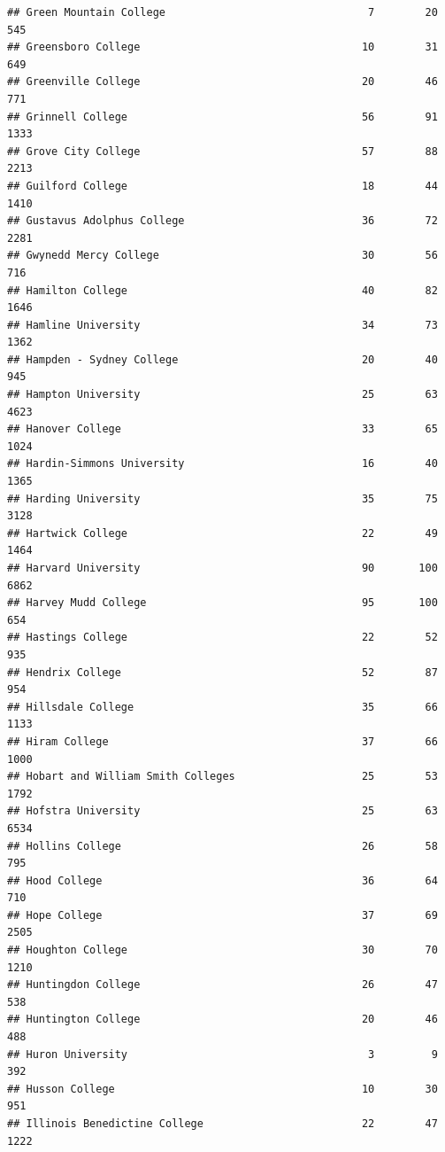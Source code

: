 \documentclass[
]{article}
\begin{document}
\begin{verbatim}
## Green Mountain College                                7        20         545
## Greensboro College                                   10        31         649
## Greenville College                                   20        46         771
## Grinnell College                                     56        91        1333
## Grove City College                                   57        88        2213
## Guilford College                                     18        44        1410
## Gustavus Adolphus College                            36        72        2281
## Gwynedd Mercy College                                30        56         716
## Hamilton College                                     40        82        1646
## Hamline University                                   34        73        1362
## Hampden - Sydney College                             20        40         945
## Hampton University                                   25        63        4623
## Hanover College                                      33        65        1024
## Hardin-Simmons University                            16        40        1365
## Harding University                                   35        75        3128
## Hartwick College                                     22        49        1464
## Harvard University                                   90       100        6862
## Harvey Mudd College                                  95       100         654
## Hastings College                                     22        52         935
## Hendrix College                                      52        87         954
## Hillsdale College                                    35        66        1133
## Hiram College                                        37        66        1000
## Hobart and William Smith Colleges                    25        53        1792
## Hofstra University                                   25        63        6534
## Hollins College                                      26        58         795
## Hood College                                         36        64         710
## Hope College                                         37        69        2505
## Houghton College                                     30        70        1210
## Huntingdon College                                   26        47         538
## Huntington College                                   20        46         488
## Huron University                                      3         9         392
## Husson College                                       10        30         951
## Illinois Benedictine College                         22        47        1222

\end{verbatim}
\end{document}
